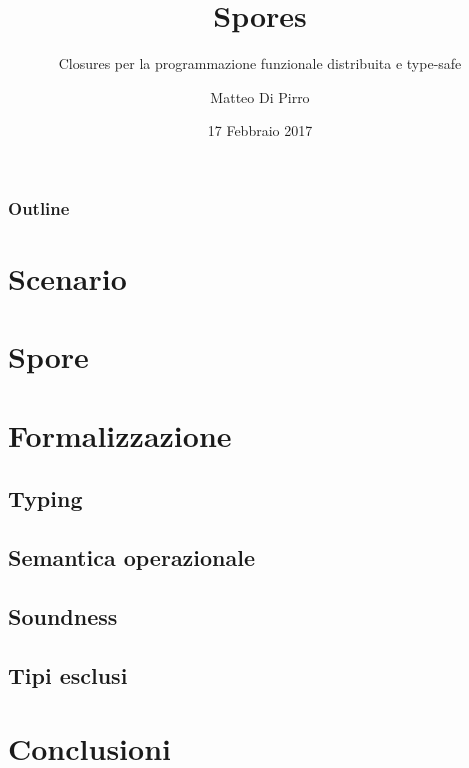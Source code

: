 \documentclass{beamer}
\title{Spores}
\subtitle{\newline Closures per la programmazione funzionale distribuita e type-safe}
\author{Matteo Di Pirro}
\date{17 Febbraio 2017}
\institute{Università degli Studi di Padova}
\begin{document}
\newcommand{\turnOffNumbers}{true} %

\begin{frame}[noframenumbering]
\titlepage
\end{frame}

\let\turnOffNumbers\empty
\begin{frame}
	\frametitle{Outline}
	\tableofcontents
\end{frame}

\section{Scenario}




\section{Spore}




\section{Formalizzazione}
\subsection{Typing}



\subsection{Semantica operazionale}


\subsection{Soundness}


\subsection{Tipi esclusi}


\section{Conclusioni}


\appendix
\makethanks
\renewcommand{\turnOffNumbers}{true} %

\end{document}
